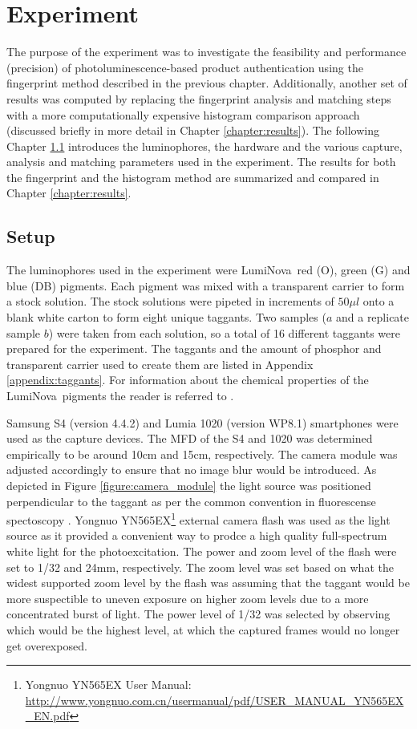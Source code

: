 \documentclass[thesis.tex]{subfiles}
\begin{document}
\chapter{Experiment}
\label{chapter:experiment}

The purpose of the experiment was to investigate the feasibility and performance (precision) of photoluminescence-based product authentication using the fingerprint method described in the previous chapter. Additionally, another set of results was computed by replacing the fingerprint analysis and matching steps with a more computationally expensive histogram comparison approach (discussed briefly in more detail in Chapter \ref{chapter:results}). The following Chapter \ref{chapter:setup} introduces the luminophores, the hardware and the various capture, analysis and matching parameters used in the experiment. The results for both the fingerprint and the histogram method are summarized and compared in Chapter \ref{chapter:results}.

\section{Setup}
\label{chapter:setup}

The luminophores used in the experiment were LumiNova\textregistered\ red (O), green (G) and blue (DB) pigments. Each pigment was mixed with a transparent carrier to form a stock solution. The stock solutions were pipeted in increments of $50\mu l$ onto a blank white carton to form eight unique taggants. Two samples ($a$ and a replicate sample $b$) were taken from each solution, so a total of 16 different taggants were prepared for the experiment. The taggants and the amount of phosphor and transparent carrier used to create them are listed in Appendix \ref{appendix:taggants}. For information about the chemical properties of the LumiNova\textregistered\ pigments the reader is referred to \cite{luminova}.

Samsung S4 (version 4.4.2) and Lumia 1020 (version WP8.1) smartphones were used as the capture devices. The MFD of the S4 and 1020 was determined empirically to be around 10cm and 15cm, respectively. The camera module was adjusted accordingly to ensure that no image blur would be introduced. As depicted in Figure \ref{figure:camera_module} the light source was positioned perpendicular to the taggant as per the common convention in fluorescense spectoscopy \cite{spectroscopy-principles}. Yongnuo YN565EX\footnote{Yongnuo YN565EX User Manual: \url{http://www.yongnuo.com.cn/usermanual/pdf/USER_MANUAL_YN565EX_EN.pdf}} external camera flash was used as the light source as it provided a convenient way to prodce a high quality full-spectrum white light for the photoexcitation. The power and zoom level of the flash were set to 1/32 and 24mm, respectively. The zoom level was set based on what the widest supported zoom level by the flash was assuming that the taggant would be more suspectible to uneven exposure on higher zoom levels due to a more concentrated burst of light. The power level of 1/32 was selected by observing which would be the highest level, at which the captured frames would no longer get overexposed.
\end{document}

